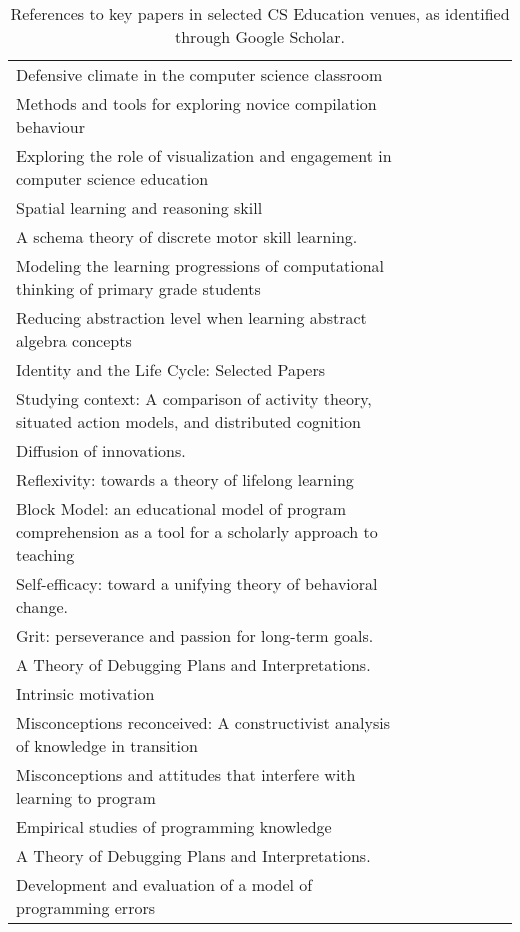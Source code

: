 \begin{table*}[t]
\begin{tabular}{p{10cm}lllllll}
Defensive climate in the computer science classroom &  &  &  &  &  &  & \\
Methods and tools for exploring novice compilation behaviour &  &  &  &  &  &  & \\
Exploring the role of visualization and engagement in computer science education &  &  &  &  &  &  & \\
Spatial learning and reasoning skill &  &  &  &  &  &  & \\
A schema theory of discrete motor skill learning. &  &  &  &  &  &  & \\
Modeling the learning progressions of computational thinking of primary grade students &  &  &  &  &  &  & \\
Reducing abstraction level when learning abstract algebra concepts &  &  &  &  &  &  & \\
Identity and the Life Cycle: Selected Papers &  &  &  &  &  &  & \\
Studying context: A comparison of activity theory, situated action models, and distributed cognition &  &  &  &  &  &  & \\
Diffusion of innovations. &  &  &  &  &  &  & \\
Reflexivity: towards a theory of lifelong learning &  &  &  &  &  &  & \\
Block Model: an educational model of program comprehension as a tool for a scholarly approach to teaching &  &  &  &  &  &  & \\
Self-efficacy: toward a unifying theory of behavioral change. &  &  &  &  &  &  & \\
Grit: perseverance and passion for long-term goals. &  &  &  &  &  &  & \\
A Theory of Debugging Plans and Interpretations. &  &  &  &  &  &  & \\
Intrinsic motivation &  &  &  &  &  &  & \\
Misconceptions reconceived: A constructivist analysis of knowledge in transition &  &  &  &  &  &  & \\
Misconceptions and attitudes that interfere with learning to program &  &  &  &  &  &  & \\
Empirical studies of programming knowledge &  &  &  &  &  &  & \\
A Theory of Debugging Plans and Interpretations. &  &  &  &  &  &  & \\
Development and evaluation of a model of programming errors &  &  &  &  &  &  & \\
\end{tabular}
\caption{References to key papers in selected CS Education venues, as identified through Google Scholar.}
\end{table*}